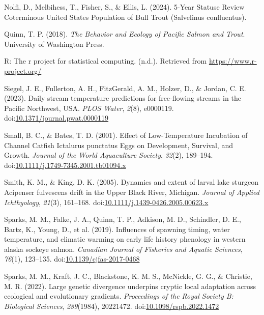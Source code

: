 \documentclass[10pt,a4paper,onecolumn]{article}
\newlength{\cslhangindent}
\newenvironment{CSLReferences}[2] %
 {\begin{list}{}{%
  \setlength{\itemindent}{0pt}
  \setlength{\leftmargin}{0pt}
  \setlength{\parsep}{0pt}
  \ifodd #1
   \setlength{\leftmargin}{\cslhangindent}
   \setlength{\itemindent}{-1\cslhangindent}
  \fi
  \setlength{\itemsep}{#2\baselineskip}}}
 {\end{list}}
\begin{document}
\begin{CSLReferences}{1}{0}
Nolfi, D., Melbihess, T., Fisher, S., \& Ellis, L. (2024). 5-Year
Statuse Review Coterminous United States Population of Bull Trout
(Salvelinus confluentus).

Quinn, T. P. (2018). \emph{The Behavior and Ecology of Pacific Salmon
and Trout}. University of Washington Press.

R: The r project for statistical computing. (n.d.). Retrieved from
\url{https://www.r-project.org/}

Siegel, J. E., Fullerton, A. H., FitzGerald, A. M., Holzer, D., \&
Jordan, C. E. (2023). Daily stream temperature predictions for
free-flowing streams in the Pacific Northwest, USA. \emph{PLOS Water},
\emph{2}(8), e0000119.
doi:\href{https://doi.org/10.1371/journal.pwat.0000119}{10.1371/journal.pwat.0000119}

Small, B. C., \& Bates, T. D. (2001). Effect of Low-Temperature
Incubation of Channel Catfish Ictalurus punctatus Eggs on Development,
Survival, and Growth. \emph{Journal of the World Aquaculture Society},
\emph{32}(2), 189--194.
doi:\href{https://doi.org/10.1111/j.1749-7345.2001.tb01094.x}{10.1111/j.1749-7345.2001.tb01094.x}

Smith, K. M., \& King, D. K. (2005). Dynamics and extent of larval lake
sturgeon Acipenser fulvescens drift in the Upper Black River, Michigan.
\emph{Journal of Applied Ichthyology}, \emph{21}(3), 161--168.
doi:\href{https://doi.org/10.1111/j.1439-0426.2005.00623.x}{10.1111/j.1439-0426.2005.00623.x}

Sparks, M. M., Falke, J. A., Quinn, T. P., Adkison, M. D., Schindler, D.
E., Bartz, K., Young, D., et al. (2019). Influences of spawning timing,
water temperature, and climatic warming on early life history phenology
in western alaska sockeye salmon. \emph{Canadian Journal of Fisheries
and Aquatic Sciences}, \emph{76}(1), 123--135.
doi:\href{https://doi.org/10.1139/cjfas-2017-0468}{10.1139/cjfas-2017-0468}

Sparks, M. M., Kraft, J. C., Blackstone, K. M. S., McNickle, G. G., \&
Christie, M. R. (2022). Large genetic divergence underpins cryptic local
adaptation across ecological and evolutionary gradients.
\emph{Proceedings of the Royal Society B: Biological Sciences},
\emph{289}(1984), 20221472.
doi:\href{https://doi.org/10.1098/rspb.2022.1472}{10.1098/rspb.2022.1472}


\end{CSLReferences}
\end{document}
